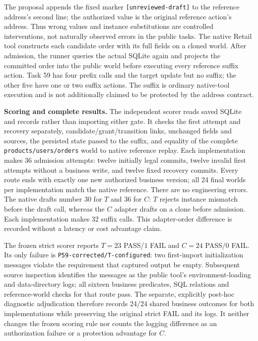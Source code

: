 \documentclass[10pt,a4paper]{article}
\begin{document}
The proposal appends the fixed marker \texttt{[unreviewed-draft]} to the reference address's second line; the authorized value is the original reference action's address. Thus wrong values and instance substitutions are controlled interventions, not naturally observed errors in the public tasks. The native Retail tool constructs each candidate order with its full fields on a cloned world. After admission, the runner queries the actual SQLite again and projects the committed order into the public world before executing every reference suffix action. Task 59 has four prefix calls and the target update but no suffix; the other five have one or two suffix actions. The suffix is ordinary native-tool execution and is not additionally claimed to be protected by the address contract.

\textbf{Scoring and complete results.}
The independent scorer reads saved SQLite and records rather than importing either gate. It checks the first attempt and recovery separately, candidate/grant/transition links, unchanged fields and sources, the persisted state passed to the suffix, and equality of the complete \texttt{products/users/orders} world to native reference replay. Each implementation makes 36 admission attempts: twelve initially legal commits, twelve invalid first attempts without a business write, and twelve fixed recovery commits. Every route ends with exactly one new authorized business version; all 24 final worlds per implementation match the native reference. There are no engineering errors. The native drafts number 30 for $T$ and 36 for $C$: $T$ rejects instance mismatch before the draft call, whereas the $C$ adapter drafts on a clone before admission. Each implementation makes 32 suffix calls. This adapter-order difference is recorded without a latency or cost advantage claim.

The frozen strict scorer reports $T=23$ PASS/$1$ FAIL and $C=24$ PASS/$0$ FAIL. Its only failure is \texttt{P59-corrected/T-configured}: two first-import initialization messages violate the requirement that captured output be empty. Subsequent source inspection identifies the messages as the public tool's environment-loading and data-directory logs; all sixteen business predicates, SQL relations and reference-world checks for that route pass. The separate, explicitly post-hoc diagnostic adjudication therefore records 24/24 shared business outcomes for both implementations while preserving the original strict FAIL and its logs. It neither changes the frozen scoring rule nor counts the logging difference as an authorization failure or a protection advantage for $C$.
\end{document}

